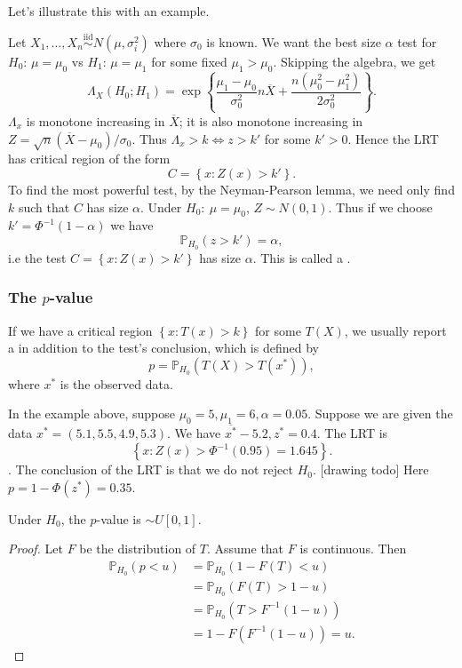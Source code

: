 \documentclass[egregdoesnotlikesansseriftitles,a4paper]{scrartcl}
\begin{document}
Let's illustrate this with an example.
\begin{example*}
      Let $X_1 , \ldots, X_{n} \overset{\operatorname{iid}}{\sim}N (\mu ,\sigma_i ^2) $ where $\sigma_0 $ is known. We want the best size $\alpha $ test for $H_0 $: $\mu =\mu_0 $ vs $H_1 $: $\mu =\mu_1 $ for some fixed $\mu_1 > \mu_0 $. Skipping the algebra, we get \[
      \Lambda_{X}(H_0 ; H_1 )= \exp \left\{ \frac{\mu_1 -\mu_0 }{\sigma_0^2}n \overline{X} + \frac{n (\mu_0^2 -\mu_1^2 )}{2\sigma_0 ^2}\right\}
      .\] $\Lambda_{x}$ is monotone increasing in $\overline{X}$; it is also monotone increasing in $Z= \sqrt{n} (\overline{X}-\mu_0 )/\sigma_{0}$. Thus $\Lambda_{x}>k \iff z>k'$ for some $k'>0$. Hence the LRT has critical region of the form \[
      C=\left\{x: Z (x)>k'\right\}
      .\]  To find the most powerful test, by the Neyman-Pearson lemma, we need only find $k$ such that $C$ has size $\alpha$. Under $H_0 : \ \mu=\mu_0 $, $Z \sim N (0,1)$. Thus if we choose $k' =\Phi^{-1}(1-\alpha)$ we have \[
      \mathbb{P}_{H_0 }(z>k' )=\alpha
      ,\] i.e the test $C=\left\{x: Z (x)>k'\right\}$ has size $\alpha$. This is called a .
\end{example*}
\subsubsection*{The $p$-value}
If we have a critical region $\left\{x: T (x)>k\right\}$ for some  $T (X)$, we usually report a  in addition to the test's conclusion, which is defined by \[
p=\mathbb{P}_{H_0 }(T (X)>T (x^*))
,\] where $x^*$ is the observed data. 

In the example above, suppose $\mu_0 =5, \mu_1 =6, \alpha=0.05 $. Suppose we are given the data $x^* =(5.1,5.5, 4.9,5.3)$. We have $\overline{x^*}-5.2, z^*=0.4$. The LRT is \[
     \left\{x: Z (x)> \Phi^{-1} (0.95)=1.645\right\}
.\] . The conclusion of the LRT is that we do not reject $H_0 $. [drawing todo] Here $p=1-\Phi (z^*)=0.35$. 
\begin{proposition}
      Under $H_0$, the $p$-value is $\sim U[0,1]$.
\end{proposition}
\begin{proof}
     Let $F$ be the distribution of $T$. Assume that $F$ is continuous. Then 
     \begin{align*}
          \mathbb{P}_{H_0 }(p< u)&=\mathbb{P}_{H_0 } (1-F (T)<u)\\
          &=\mathbb{P}_{H_0 } (F (T)>1-u)\\
          &= \mathbb{P}_{H_0 } (T > F^{-1}(1-u))\\
          &= 1-F(F^{-1}(1-u))=u.
     \end{align*}
\end{proof}
\end{document}
